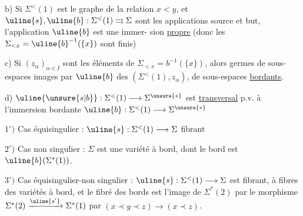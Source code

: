 b) Si $\Sigma^{<}(1)$ est le graphe de la relation
$x<y$, et $\uline{s},\uline{b}:\Sigma^{<}(1)\rightrightarrows\Sigma$ sont les applications
source et but, \deleted{\unsure{---}} l'application $\uline{b}$ est une immer-
sion  \uline{propre} (donc les $\Sigma_{<x}=\uline{b}^{-1}(\{x\})$
sont finis)

c) Si $(z_\alpha)_{\alpha\in I}$ sont les éléments de $\Sigma_{<x}=b^{-1}(\{x\})$,
alors  germes  de sous-espaces 
images par $\uline{b}$ des  $(\Sigma^{<}(1),z_\alpha)$, 
de sous-espaces \uline{bordants}.

d) $\uline{\unsure{s|b}}:\Sigma^{<}(1)\longrightarrow\Sigma^{\unsure{*}}$ est \uline{transversal} p.v. à l'immersion
bordante $\uline{b}:\Sigma^{<}(1)\longrightarrow\Sigma^{\unsure{*}}$

$1^{\circ})$ Cas équisingulier : $\uline{s}:\Sigma^{<}(1)\longrightarrow\Sigma$ fibrant 

$2^{\circ})$ Cas non singulier : $\Sigma$ est une variété à bord,
dont le bord est $\uline{b}(\Sigma^{*}(1))$.

$3^{\circ})$ Cas équisingulier-non singulier : $\uline{s}:\Sigma^{<}(1)\longrightarrow\Sigma$ est
fibrant,  à fibres des variétés à bord, et le
fibré des bords est l'image de $\Sigma^{*}(2)$ par
le morphisme $\Sigma^{*}(2)\xrightarrow{\uline{s'}}\Sigma^{*}(1)$ 
par $(x\prec y\prec z)\longrightarrow(x\prec z)$.

